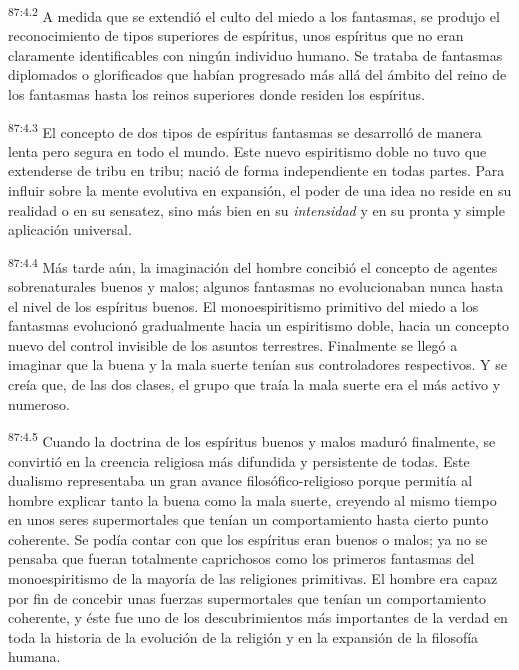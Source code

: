 \documentclass[twoside, 11pt]{book}
\begin{document}
\par
\textsuperscript{87:4.2} A medida que se extendió el culto del miedo a los fantasmas, se produjo el reconocimiento de tipos superiores de espíritus, unos espíritus que no eran claramente identificables con ningún individuo humano. Se trataba de fantasmas diplomados o glorificados que habían progresado más allá del ámbito del reino de los fantasmas hasta los reinos superiores donde residen los espíritus.

\par
\textsuperscript{87:4.3} El concepto de dos tipos de espíritus fantasmas se desarrolló de manera lenta pero segura en todo el mundo. Este nuevo espiritismo doble no tuvo que extenderse de tribu en tribu; nació de forma independiente en todas partes. Para influir sobre la mente evolutiva en expansión, el poder de una idea no reside en su realidad o en su sensatez, sino más bien en su \textit{intensidad} y en su pronta y simple aplicación universal.

\par
\textsuperscript{87:4.4} Más tarde aún, la imaginación del hombre concibió el concepto de agentes sobrenaturales buenos y malos; algunos fantasmas no evolucionaban nunca hasta el nivel de los espíritus buenos. El monoespiritismo primitivo del miedo a los fantasmas evolucionó gradualmente hacia un espiritismo doble, hacia un concepto nuevo del control invisible de los asuntos terrestres. Finalmente se llegó a imaginar que la buena y la mala suerte tenían sus controladores respectivos. Y se creía que, de las dos clases, el grupo que traía la mala suerte era el más activo y numeroso.

\par
\textsuperscript{87:4.5} Cuando la doctrina de los espíritus buenos y malos maduró finalmente, se convirtió en la creencia religiosa más difundida y persistente de todas. Este dualismo representaba un gran avance filosófico-religioso porque permitía al hombre explicar tanto la buena como la mala suerte, creyendo al mismo tiempo en unos seres supermortales que tenían un comportamiento hasta cierto punto coherente. Se podía contar con que los espíritus eran buenos o malos; ya no se pensaba que fueran totalmente caprichosos como los primeros fantasmas del monoespiritismo de la mayoría de las religiones primitivas. El hombre era capaz por fin de concebir unas fuerzas supermortales que tenían un comportamiento coherente, y éste fue uno de los descubrimientos más importantes de la verdad en toda la historia de la evolución de la religión y en la expansión de la filosofía humana.
\end{document}
